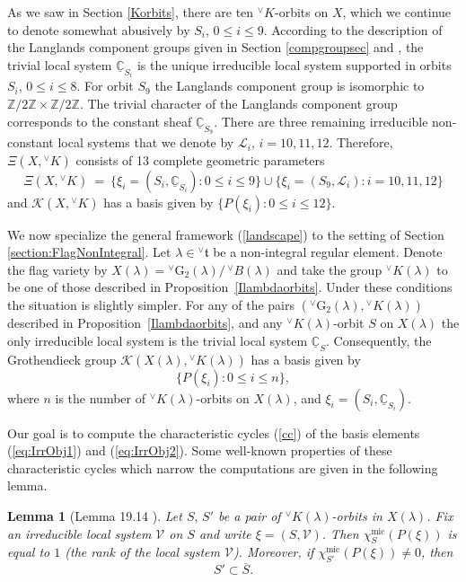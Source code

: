 \documentclass[a4paper, 11pt]{article}
\newtheorem{lem}[theo]{Lemma}
\newcommand{\C}{\mathbb{C}}
\begin{document}
As we saw in Section \ref{Korbits}, there are ten
${}^{\vee}K$-orbits on $X$, 
which we continue to denote somewhat abusively by $S_{i}$, $0\leq i\leq 9$.  
According to the description of the Langlands component groups
given in Section \ref{compgroupsec} and \cite[Lemma 7.3 (e)]{ABV}, the
trivial local system 
$\underline{\C}_{S_i}$ is the unique irreducible local system supported in orbits
$S_{i}$, $0 \leq i \leq 8$. For orbit $S_{9}$ the Langlands component
group is isomorphic to $\mathbb{Z}/2\mathbb{Z} \times
\mathbb{Z}/2\mathbb{Z}$.  The trivial character of the Langlands
component group corresponds to the
constant sheaf $\underline{\C}_{S_9}$.  There are three remaining
irreducible non-constant
local systems that we denote by $\mathcal{L}_i,\, i=10,11,12$.  
Therefore, $\Xi(X,{}^{\vee}K)$ consists of 13
complete geometric parameters
\begin{equation}\label{eq:IrrObj1}
\Xi(X,{}^{\vee}K)\ =\ \{\xi_i=(S_i,\underline{\C}_{S_i}):0\leq
i\leq 9\}\cup\{\xi_i=(S_9,\mathcal{L}_{i}):i=10,11,12\} 
\end{equation}
and $\mathscr{K}(X,{}^{\vee}K)$ has a basis given by
$\{P(\xi_i):0\leq i\leq 12\}$. 

We now specialize the general framework (\ref{landscape}) to
the setting of Section \ref{section:FlagNonIntegral}. 
Let $\lambda \in {^\vee}\mathfrak{t}$ be a non-integral regular element. 
Denote the flag variety by
$X(\lambda)={}^{\vee}\mathrm{G}_{2}(\lambda)/\,{}^{\vee}B(\lambda)$ and
take the group ${}^{\vee}K(\lambda)$ to be one of those described in
Proposition~\ref{Ilambdaorbits}. 
Under these conditions the situation is slightly simpler. For
any of the pairs $({}^{\vee}\mathrm{G}_{2}(\lambda),
{}^{\vee}K(\lambda))$ described in Proposition~\ref{Ilambdaorbits},
and any  $^{\vee}K(\lambda)$-orbit $S$ on $X(\lambda)$ the only
irreducible local system is the trivial local system
$\underline{\mathbb{C}}_S$. Consequently, 
the Grothendieck group $\mathscr{K}(X(\lambda),{}^{\vee}K(\lambda))$
has a basis given by  
\begin{equation}\label{eq:IrrObj2}
\{P(\xi_i):0\leq i\leq n\},
\end{equation} 
where $n$ is the number of ${}^{\vee}K(\lambda)$-orbits on
$X(\lambda)$, and $\xi_i = (S_i, \underline{\mathbb{C}}_{S_i})$. 

Our goal is to compute the characteristic cycles (\ref{cc}) of the
basis elements (\ref{eq:IrrObj1}) and (\ref{eq:IrrObj2}).  Some
well-known properties of these characteristic cycles which narrow the
computations are given in the following lemma.
\begin{lem}[Lemma 19.14 \cite{ABV}]\label{lem:lemorbit}
Let $S,\, S'$ be a pair of ${^\vee}K(\lambda)$-orbits in
$X(\lambda)$. Fix an irreducible local system $\mathcal{V}$  
on $S$ and write $\xi=(S,\mathcal{V})$. Then
$\chi_{S}^{\mathrm{mic}}(P(\xi))$ is equal to $1$ (the
rank of the local system $\mathcal{V}$). Moreover, if
$\chi_{S'}^{\mathrm{mic}}(P(\xi))\neq 0$, then $$S'\subset
\overline{S}.$$  
\end{lem}
\end{document}

